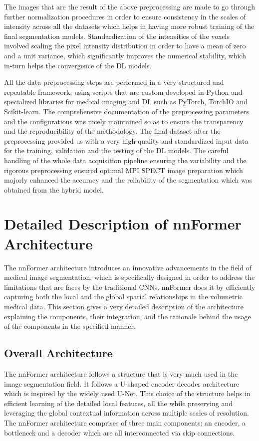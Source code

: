 The images that are the result of the above preprocessing are made to go through further normalization procedures in order to ensure consistency in the scales of intensity across all the datasets which helps in having more robust training of the final segmentation models. Standardization of the intensities of the voxels involved scaling the pixel intensity distribution in order to have a mean of zero and a unit variance, which significantly improves the numerical stability, which in-turn helps the convergence of the DL models.

All the data preprocessing steps are performed in a very structured and repeatable framework, using scripts that are custom developed in Python and specialized libraries for medical imaging and DL such as PyTorch, TorchIO and Scikit-learn. The comprehensive documentation of the preprocessing parameters and the configurations was nicely maintained so as to ensure the transparency and the reproducibility of the methodology. The final dataset after the preprocessing provided us with a very high-quality and standardized input data for the training, validation and the testing of the DL models. The careful handling of the whole data acquisition pipeline ensuring the variability and the rigorous preprocessing ensured optimal MPI SPECT image preparation which majorly enhanced the accuracy and the reliability of the segmentation which was obtained from the hybrid model.

\section{Detailed Description of nnFormer Architecture}

The nnFormer architecture introduces an innovative advancements in the field of medical image segmentation, which is specifically designed in order to address the limitations that are faces by the traditional CNNs. nnFormer does it by efficiently capturing both the local and the global spatial relationships in the volumetric medical data. This section gives a very detailed description of the architecture explaining the components, their integration, and the rationale behind the usage of the components in the specified manner.

\subsection{Overall Architecture}

The nnFormer architecture follows a structure that is very much used in the image segmentation field. It follows a U-shaped encoder decoder architecture which is inspired by the widely used U-Net. This choice of the structure helps in efficient learning of the detailed local features, all the while preserving and leveraging the global contextual information across multiple scales of resolution. The nnFormer architecture comprises of three main components: an encoder, a bottleneck and a decoder which are all interconnected via skip connections.

